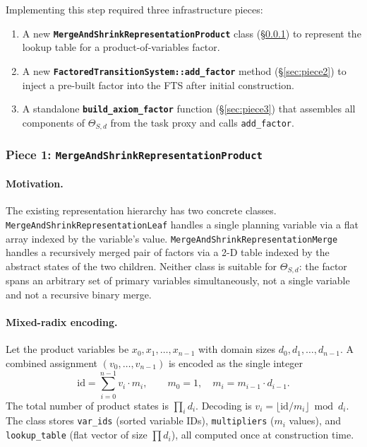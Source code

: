 \documentclass[11pt,a4paper]{article}
\begin{document}
Implementing this step required three infrastructure pieces:
\begin{enumerate}
  \item A new \textbf{\texttt{MergeAndShrinkRepresentationProduct}} class
        (\S\ref{sec:piece1}) to represent the lookup table for a product-of-variables
        factor.
  \item A new \textbf{\texttt{FactoredTransitionSystem::add\_factor}} method
        (\S\ref{sec:piece2}) to inject a pre-built factor into the FTS after
        initial construction.
  \item A standalone \textbf{\texttt{build\_axiom\_factor}} function
        (\S\ref{sec:piece3}) that assembles all components of $\Theta_{S,d}$
        from the task proxy and calls \texttt{add\_factor}.
\end{enumerate}

\subsubsection{Piece 1: \texttt{MergeAndShrinkRepresentationProduct}}
\label{sec:piece1}

\paragraph{Motivation.}
The existing representation hierarchy has two concrete classes.
\texttt{MergeAndShrinkRepresentationLeaf} handles a single planning variable
via a flat array indexed by the variable's value.
\texttt{MergeAndShrinkRepresentationMerge} handles a recursively merged pair
of factors via a 2-D table indexed by the abstract states of the two children.
Neither class is suitable for $\Theta_{S,d}$: the factor spans an arbitrary
set of primary variables simultaneously, not a single variable and not a
recursive binary merge.

\paragraph{Mixed-radix encoding.}
Let the product variables be $x_0, x_1, \ldots, x_{n-1}$ with domain sizes
$d_0, d_1, \ldots, d_{n-1}$.  A combined assignment $(v_0, \ldots, v_{n-1})$
is encoded as the single integer
\[
  \mathrm{id} = \sum_{i=0}^{n-1} v_i \cdot m_i,
  \qquad
  m_0 = 1,\quad m_i = m_{i-1} \cdot d_{i-1}.
\]
The total number of product states is $\prod_i d_i$.  Decoding is
$v_i = \lfloor \mathrm{id} / m_i \rfloor \bmod d_i$.  The class stores
\texttt{var\_ids} (sorted variable IDs), \texttt{multipliers} ($m_i$ values),
and \texttt{lookup\_table} (flat vector of size $\prod d_i$), all computed
once at construction time.
\end{document}
